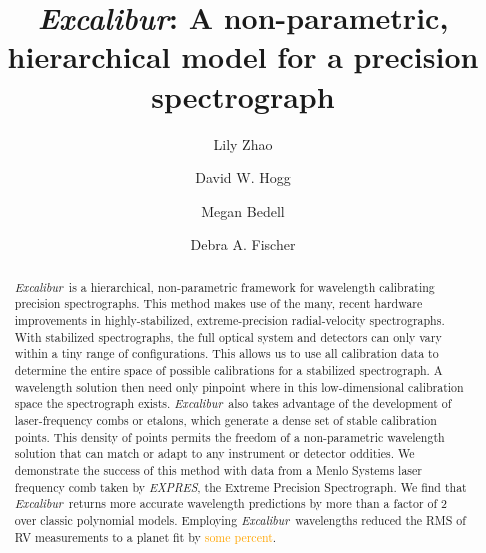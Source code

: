 \documentclass[twocolumn]{aastex63}
\newcommand{\lz}[1]{\textcolor{orange}{#1}}
\newcommand{\project}[1]{\textsl{#1}}
\newcommand{\name}{\project{Excalibur}}
\newcommand{\acronym}[1]{{\small{#1}}}
\newcommand{\expres}{\project{\acronym{EXPRES}}}
\begin{document}
\title{\name:
A non-parametric, hierarchical model for a precision spectrograph}


\author[0000-0002-3852-3590]{Lily Zhao}

\author[0000-0003-2866-9403]{David W. Hogg}

\author[0000-0001-9907-7742]{Megan Bedell}

\author[0000-0003-2221-0861]{Debra A. Fischer}

\begin{abstract}
\name\ is a hierarchical, non-parametric framework for wavelength calibrating precision spectrographs.  This method makes use of the many, recent hardware improvements in highly-stabilized, extreme-precision radial-velocity spectrographs.  With stabilized spectrographs, the full optical system and detectors can only vary within a tiny range of configurations.  This allows us to use all calibration data to determine the entire space of possible calibrations for a stabilized spectrograph.  A wavelength solution then need only pinpoint where in this low-dimensional calibration space the spectrograph exists.  \name\ also takes advantage of the development of laser-frequency combs or etalons, which generate a dense set of stable calibration points.  This density of points permits the freedom of a non-parametric wavelength solution that can match or adapt to any instrument or detector oddities.  We demonstrate the success of this method with data from a Menlo Systems laser frequency comb taken by \expres, the Extreme Precision Spectrograph.  We find that \name\ returns more accurate wavelength predictions by more than a factor of 2 over classic polynomial models.  Employing \name\ wavelengths reduced the RMS of RV measurements to a planet fit by \lz{some percent}.
\end{abstract}
\end{document}
